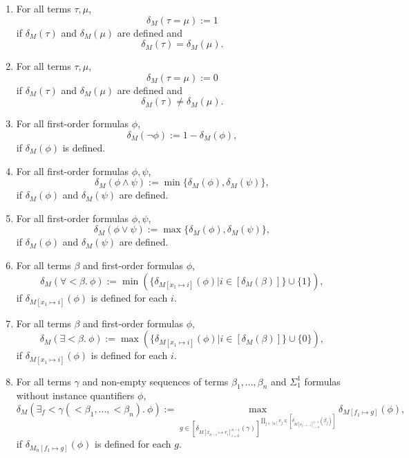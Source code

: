 \documentclass[11pt]{article}
\begin{document}
\begin{enumerate}
	\item For all terms $\tau, \mu$,
		\begin{equation}
			\delta_M(\tau = \mu) := 1
		\end{equation}
		if $\delta_M(\tau)$ and $\delta_M(\mu)$ are defined and
		\begin{equation}
			\delta_M(\tau) = \delta_M(\mu).
		\end{equation}
	\item For all terms $\tau, \mu$,
		\begin{equation}
			\delta_M(\tau = \mu) := 0
		\end{equation}
		if $\delta_M(\tau)$ and $\delta_M(\mu)$ are defined and 
		\begin{equation}
			\delta_M(\tau) \neq \delta_M(\mu).
		\end{equation}
	\item For all first-order formulas $\phi$,
		\begin{equation}
			\delta_M(\neg\phi) := 1 - \delta_M(\phi),
		\end{equation}
		if $\delta_M(\phi)$ is defined.
	\item For all first-order formulas $\phi, \psi$,
		\begin{equation}
			\delta_M(\phi \wedge \psi) := \min\{\delta_M(\phi), \delta_M(\psi)\},
		\end{equation}
		if $\delta_M(\phi)$ and $\delta_M(\psi)$ are defined.
	\item For all first-order formulas $\phi, \psi$,
		\begin{equation}
			\delta_M(\phi \vee \psi) := \max\{\delta_M(\phi), \delta_M(\psi)\},
		\end{equation}
		if $\delta_M(\phi)$ and $\delta_M(\psi)$ are defined.
	\item For all terms $\beta$ and first-order formulas $\phi$,
		\begin{equation}
			\delta_M(\forall < \beta.\ \phi) := \min(\{\delta_{M[x_1 \mapsto i]}(\phi) | i \in [\delta_M(\beta)]\} \cup \{1\}),
		\end{equation}
		if $\delta_{M[x_1 \mapsto i]}(\phi)$ is defined for each $i$.
	\item For all terms $\beta$ and first-order formulas $\phi$,
		\begin{equation}
			\delta_M(\exists < \beta.\ \phi) := \max(\{\delta_{M[x_1 \mapsto i]}(\phi) | i \in [\delta_M(\beta)]\} \cup \{0\}), 
		\end{equation}
		if $\delta_{M[x_1 \mapsto i]}(\phi)$ is defined for each $i$.
	\item For all terms $\gamma$ and non-empty sequences of terms $\beta_1, ..., \beta_n$ and $\Sigma^1_1$ formulas without instance quantifiers $\phi$,
		\begin{equation}
			\delta_M(\exists_f < \gamma(<\beta_1, ..., <\beta_n).\ \phi)
			:= \max_{g \in [\delta_{M[x_{n-i} \mapsto v_i]_{i=0}^{n-1}}(\gamma)]^{\prod_{j \in [n]} v_j \in [\delta_{M[x_{j-1-i}]_{i=0}^{j-1}}(\beta_j)]}} \delta_{M[f_1 \mapsto g]}(\phi),
		\end{equation}
		if $\delta_{M_n[f_1 \mapsto g]}(\phi)$ is defined for each $g$. 


\end{enumerate}
\end{document}
